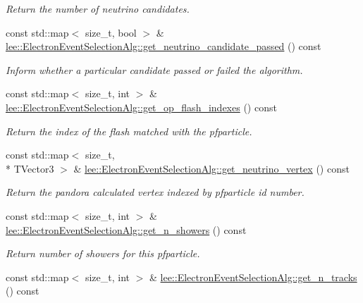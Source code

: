 \begin{DoxyCompactItemize}
\begin{DoxyCompactList}\small\item\em Return the number of neutrino candidates. \end{DoxyCompactList}\item 
const std\-::map$<$ size\-\_\-t, bool $>$ \& \hyperlink{group__lee_gab34dc2b97e0065b07a5233e3b46b83a4}{lee\-::\-Electron\-Event\-Selection\-Alg\-::get\-\_\-neutrino\-\_\-candidate\-\_\-passed} () const 
\begin{DoxyCompactList}\small\item\em Inform whether a particular candidate passed or failed the algorithm. \end{DoxyCompactList}\item 
\hypertarget{group__lee_gaffda5b411008752c1355a9dd3a1d9c1e}{const std\-::map$<$ size\-\_\-t, int $>$ \& \hyperlink{group__lee_gaffda5b411008752c1355a9dd3a1d9c1e}{lee\-::\-Electron\-Event\-Selection\-Alg\-::get\-\_\-op\-\_\-flash\-\_\-indexes} () const }\label{group__lee_gaffda5b411008752c1355a9dd3a1d9c1e}

\begin{DoxyCompactList}\small\item\em Return the index of the flash matched with the pfparticle. \end{DoxyCompactList}\item 
\hypertarget{group__lee_gac098d39d04f407c9bfc574da4b82fee6}{const std\-::map$<$ size\-\_\-t, \\*
T\-Vector3 $>$ \& \hyperlink{group__lee_gac098d39d04f407c9bfc574da4b82fee6}{lee\-::\-Electron\-Event\-Selection\-Alg\-::get\-\_\-neutrino\-\_\-vertex} () const }\label{group__lee_gac098d39d04f407c9bfc574da4b82fee6}

\begin{DoxyCompactList}\small\item\em Return the pandora calculated vertex indexed by pfparticle id number. \end{DoxyCompactList}\item 
\hypertarget{group__lee_ga43afa7fb8c10333f89774c6d4ea714dc}{const std\-::map$<$ size\-\_\-t, int $>$ \& \hyperlink{group__lee_ga43afa7fb8c10333f89774c6d4ea714dc}{lee\-::\-Electron\-Event\-Selection\-Alg\-::get\-\_\-n\-\_\-showers} () const }\label{group__lee_ga43afa7fb8c10333f89774c6d4ea714dc}

\begin{DoxyCompactList}\small\item\em Return number of showers for this pfparticle. \end{DoxyCompactList}\item 
\hypertarget{group__lee_gad24d64eca5e56d0550572b24d5e213f7}{const std\-::map$<$ size\-\_\-t, int $>$ \& \hyperlink{group__lee_gad24d64eca5e56d0550572b24d5e213f7}{lee\-::\-Electron\-Event\-Selection\-Alg\-::get\-\_\-n\-\_\-tracks} () const }\label{group__lee_gad24d64eca5e56d0550572b24d5e213f7}


\end{DoxyCompactItemize}
